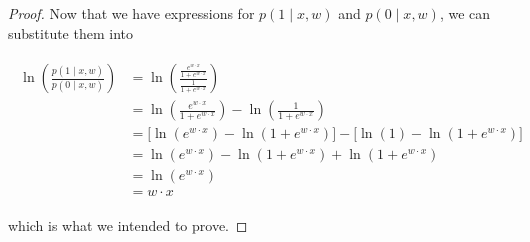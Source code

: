 \documentclass[12pt]{article}
\begin{document}
\begin{enumerate}
\begin{proof}
   Now that we have expressions for $p(1\mid x,w)$ and $p(0\mid x,w)$, we can substitute them into
   
   	\begin{align*}
   	\begin{split}
   	\ln\left(\frac{p(1\mid x,w)}{p(0\mid x,w)}\right) &= \ln \left( \frac{\frac{e^{w \cdot x}}{1 + e^{w \cdot x}}}{\frac{1}{1 + e^{w \cdot x}}} \right)  \\
   	&= \ln \left( \frac{e^{w \cdot x}}{1 + e^{w \cdot x}} \right) - \ln \left( \frac{1}{1 + e^{w \cdot x}} \right) \\
   	&= \Big[ \ln \left( e^{w \cdot x} \right) - \ln \left( 1 + e^{w \cdot x} \right)  \Big] - \Big[ \ln \left( 1 \right) - \ln \left( 1 + e^{w \cdot x} \right)   \Big] \\
   	&= \ln \left( e^{w \cdot x} \right) - \ln \left( 1 + e^{w \cdot x} \right) + \ln \left( 1 + e^{w \cdot x} \right) \\
   	&= \ln \left( e^{w \cdot x} \right) \\
   	&= w \cdot x
   	\end{split}
   	\end{align*}
   
   which is what we intended to prove.
  
   \end{proof}
\end{enumerate}
\end{document}
